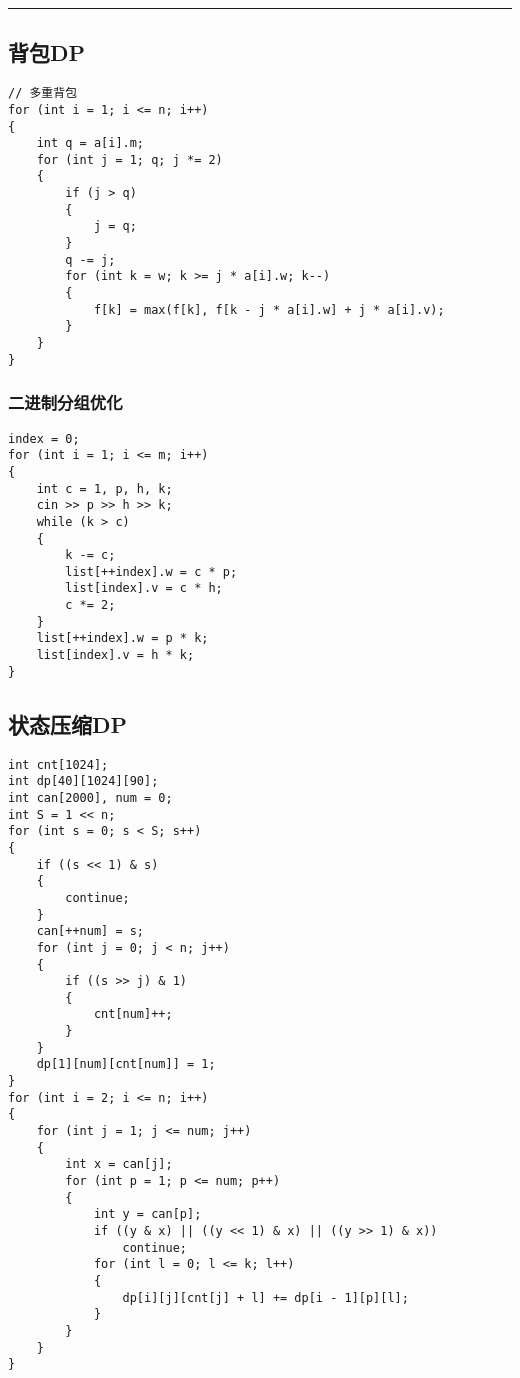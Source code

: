 \documentclass[]{article}
\begin{document}
\begin{center}\rule{0.5\linewidth}{0.5pt}\end{center}

\hypertarget{ux80ccux5305dp}{%
\subsection{背包DP}\label{ux80ccux5305dp}}

\begin{verbatim}
// 多重背包
for (int i = 1; i <= n; i++)
{
    int q = a[i].m;
    for (int j = 1; q; j *= 2)
    {
        if (j > q)
        {
            j = q;
        }
        q -= j;
        for (int k = w; k >= j * a[i].w; k--)
        {
            f[k] = max(f[k], f[k - j * a[i].w] + j * a[i].v);
        }
    }
}
\end{verbatim}

\hypertarget{ux4e8cux8fdbux5236ux5206ux7ec4ux4f18ux5316}{%
\subsubsection{二进制分组优化}\label{ux4e8cux8fdbux5236ux5206ux7ec4ux4f18ux5316}}

\begin{verbatim}
index = 0;
for (int i = 1; i <= m; i++)
{
    int c = 1, p, h, k;
    cin >> p >> h >> k;
    while (k > c)
    {
        k -= c;
        list[++index].w = c * p;
        list[index].v = c * h;
        c *= 2;
    }
    list[++index].w = p * k;
    list[index].v = h * k;
}
\end{verbatim}

\hypertarget{ux72b6ux6001ux538bux7f29dp}{%
\subsection{状态压缩DP}\label{ux72b6ux6001ux538bux7f29dp}}

\begin{verbatim}
int cnt[1024];
int dp[40][1024][90];
int can[2000], num = 0;
int S = 1 << n;
for (int s = 0; s < S; s++)
{
    if ((s << 1) & s)
    {
        continue;
    }
    can[++num] = s;
    for (int j = 0; j < n; j++)
    {
        if ((s >> j) & 1)
        {
            cnt[num]++;
        }
    }
    dp[1][num][cnt[num]] = 1;
}
for (int i = 2; i <= n; i++)
{
    for (int j = 1; j <= num; j++)
    {
        int x = can[j];
        for (int p = 1; p <= num; p++)
        {
            int y = can[p];
            if ((y & x) || ((y << 1) & x) || ((y >> 1) & x))
                continue;
            for (int l = 0; l <= k; l++)
            {
                dp[i][j][cnt[j] + l] += dp[i - 1][p][l];
            }
        }
    }
}
\end{verbatim}
\end{document}
